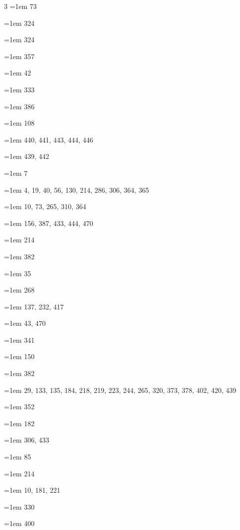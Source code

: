 \begin{multicols}{3}
\hangindent=1em  73\par
\hangindent=1em  324\par
\hangindent=1em  324\par
\hangindent=1em  357\par
\hangindent=1em  42\par
\hangindent=1em  333\par
\hangindent=1em  386\par
\hangindent=1em  108\par
\hangindent=1em  440, 441, 443, 444, 446\par
\hangindent=1em  439, 442\par
\hangindent=1em  7\par
\hangindent=1em  4, 19, 40, 56, 130, 214, 286, 306, 364, 365\par
\hangindent=1em  10, 73, 265, 310, 364\par
\hangindent=1em  156, 387, 433, 444, 470\par
\hangindent=1em  214\par
\hangindent=1em  382\par
\hangindent=1em  35\par
\hangindent=1em  268\par
\hangindent=1em  137, 232, 417\par
\hangindent=1em  43, 470\par
\hangindent=1em  341\par
\hangindent=1em  150\par
\hangindent=1em  382\par
\hangindent=1em  29, 133, 135, 184, 218, 219, 223, 244, 265, 320, 373, 378, 402, 420, 439\par
\hangindent=1em  352\par
\hangindent=1em  182\par
\hangindent=1em  306, 433\par
\hangindent=1em  85\par
\hangindent=1em  214\par
\hangindent=1em  10, 181, 221\par
\hangindent=1em  330\par
\hangindent=1em  400\par

\end{multicols}
